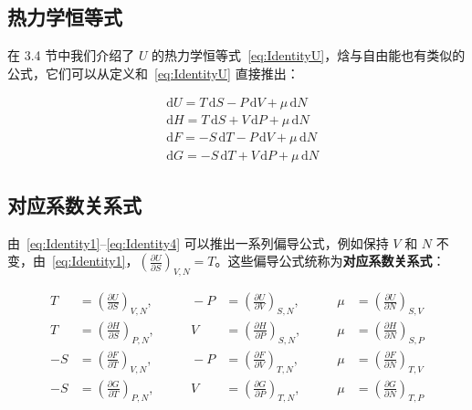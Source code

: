\subsection{热力学恒等式}
在 3.4 节中我们介绍了 $U$ 的热力学恒等式~\eqref{eq:IdentityU}，焓与自由能也有类似的公式，它们可以从定义和~\eqref{eq:IdentityU} 直接推出：
\begin{corollary}[热力学恒等式]
    \begin{align}
        &\mathrm{d}U=T\,\mathrm{d}S-P\,\mathrm{d}V+\mu\,\mathrm{d}N\label{eq:Identity1}\\
        &\mathrm{d}H=T\,\mathrm{d}S+V\,\mathrm{d}P+\mu\,\mathrm{d}N\label{eq:Identity2}\\
        &\mathrm{d}F=-S\,\mathrm{d}T-P\,\mathrm{d}V+\mu\,\mathrm{d}N\label{eq:Identity3}\\ 
        &\mathrm{d}G=-S\,\mathrm{d}T+V\,\mathrm{d}P+\mu\,\mathrm{d}N\label{eq:Identity4}
    \end{align}
\end{corollary}

\subsection{对应系数关系式}
由~\eqref{eq:Identity1}--\eqref{eq:Identity4} 可以推出一系列偏导公式，例如保持 $V$ 和 $N$ 不变，由~\eqref{eq:Identity1}，$\left(\frac{\partial U}{\partial S}\right)_{V,N}=T$。这些偏导公式统称为\textbf{对应系数关系式}：
\begin{corollary}[对应系数关系式]
    \begin{align}
        T &= \left(\frac{\partial U}{\partial S}\right)_{V,N},
        &\qquad
        -P &= \left(\frac{\partial U}{\partial V}\right)_{S,N},
        &\qquad
        \mu &= \left(\frac{\partial U}{\partial N}\right)_{S,V}\label{eq:corres1}\\
        T &= \left(\frac{\partial H}{\partial S}\right)_{P,N},
        &\qquad
        V &= \left(\frac{\partial H}{\partial P}\right)_{S,N},
        &\qquad
        \mu &= \left(\frac{\partial H}{\partial N}\right)_{S,P}\label{eq:corres2}\\
        -S &= \left(\frac{\partial F}{\partial T}\right)_{V,N},
        &\qquad
        -P &= \left(\frac{\partial F}{\partial V}\right)_{T,N},
        &\qquad
        \mu &= \left(\frac{\partial F}{\partial N}\right)_{T,V}\label{eq:corres3}\\
        -S &= \left(\frac{\partial G}{\partial T}\right)_{P,N},
        &\qquad
        V &= \left(\frac{\partial G}{\partial P}\right)_{T,N},
        &\qquad
        \mu &= \left(\frac{\partial G}{\partial N}\right)_{T,P}\label{eq:corres4}
    \end{align}
\end{corollary}

